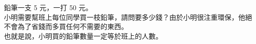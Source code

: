 鉛筆一支 5 元，一打 50 元。\\
小明需要幫班上每位同學買一枝鉛筆，請問要多少錢？由於小明很注重環保，他絕不會為了省錢而多買任何不需要的東西。\\
也就是說，小明買的鉛筆數量一定等於班上的人數。\\
